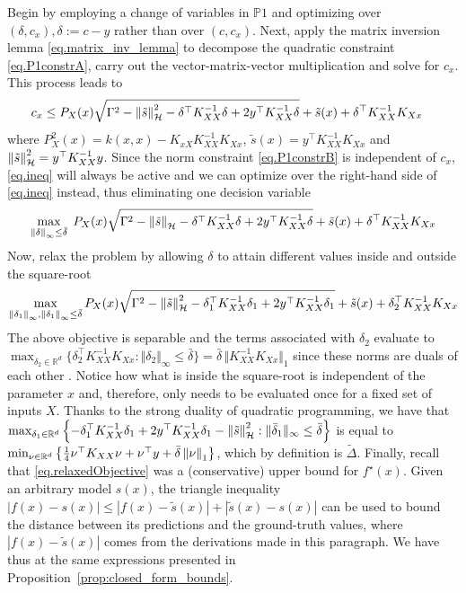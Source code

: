 Begin by employing a change of variables in $\mathds{P}1$ and optimizing over $(\delta, c_x), \delta := c - y$ rather than over $(c , c_x)$. Next, apply the matrix inversion lemma \eqref{eq.matrix_inv_lemma} to decompose the quadratic constraint \eqref{eq.P1constrA}, carry out the vector-matrix-vector multiplication and solve for $c_x$. This process leads to
\begin{equation}
	\begin{aligned}
		c_x  \leq \;&  P_X(x) \sqrt{ \Gamma^2 - \left\| \tilde s \right\|_\mathcal{H}^2 - \delta^\top K_{XX}^{-1}\delta +2y^\top K_{XX}^{-1}\delta} +\tilde s(x) 
		+ \delta^\top K_{XX}^{-1}K_{Xx}
	\end{aligned}	
	\label{eq.ineq}
\end{equation}
where $P_X^2(x) = k(x,x) - K_{xX} K_{XX}^{-1} K_{Xx}$, $\tilde{s}(x) = y^\top K_{XX}^{-1} K_{Xx}$ and $\left\| \tilde s \right\|_\mathcal{H}^2 = y^\top K_{XX}^{-1} y$. Since the norm constraint \eqref{eq.P1constrB} is independent of $c_x$, \eqref{eq.ineq} will always be active and we can optimize over the right-hand side of \eqref{eq.ineq} instead, thus eliminating one decision variable
\begin{equation}
	\max_{\left\| \delta \right\|_\infty \leq \bar \delta}\; P_X(x) \sqrt{ \Gamma^2 - \left\| \tilde s \right\|_\mathcal{H} - \delta^\top K_{XX}^{-1}\delta +2y^\top K_{XX}^{-1}\delta} + \tilde s(x) + \delta^\top K_{XX}^{-1}K_{Xx} 
\end{equation}
Now, relax the problem by allowing $\delta$ to attain different values inside and outside the square-root
	\begin{equation}
		\max_{\left\| \delta_1 \right\|_\infty,\left\| \delta_1 \right\|_\infty \leq \bar\delta} P_X(x) \sqrt{ \Gamma^2 - \left\| \tilde s \right\|_\mathcal{H}^2 - \delta_1^\top K_{XX}^{-1}\delta_1 +2y^\top K_{XX}^{-1}\delta_1} + \tilde s(x) + \delta_2^\top K_{XX}^{-1}K_{Xx}  \label{eq.relaxedObjective}
	\end{equation}
The above objective is separable and the terms associated with $\delta_2$ evaluate to $\max_{\delta_2 \in \mathbb{R}^d} \{ \delta_2^\top K_{XX}^{-1}K_{Xx} : \Vert \delta_2 \Vert_\infty \leq \bar\delta \} = \bar{\delta} \, \Vert K_{XX}^{-1}K_{Xx} \Vert_1$ since these norms are duals of each other \citep[§A.1.6]{boyd2004convex}. Notice how what is inside the square-root is independent of the parameter $x$ and, therefore, only needs to be evaluated once for a fixed set of inputs $X$. Thanks to the strong duality of quadratic programming, we have that $\max_{\delta_1 \in \mathbb{R}^d} \left\{ -\delta_1^\top K_{XX}^{-1}\delta_1 + 2y^\top K_{XX}^{-1}\delta_1 - \left\| \tilde s \right\|_\mathcal{H}^2 : \Vert \bar\delta_1 \Vert_\infty \leq \bar\delta \right\}$  is equal to $\min_{\nu \in \mathbb{R}^d} \left\{ \frac{1}{4}\nu^\top K_{XX}\nu + \nu^\top y + \bar{\delta} \left\| \nu \right\|_1\right\}$, which by definition is $\tilde \Delta$.
Finally, recall that \eqref{eq.relaxedObjective} was a (conservative) upper bound for $f^\star(x)$. Given an arbitrary model $s(x)$, the triangle inequality $|f(x) - s(x)| \leq |f(x) - \tilde s(x)| + |\tilde s(x) - s(x)|$ can be used to bound the distance between its predictions and the ground-truth values, where $|f(x) - \tilde s(x)|$ comes from the derivations made in this paragraph. We have thus at the same expressions presented in Proposition~\ref{prop:closed_form_bounds}.

